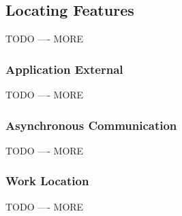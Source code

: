 \subsection{Locating Features} %
TODO ---- MORE
\subsubsection{Application External} %
TODO ---- MORE
\subsubsection{Asynchronous Communication} %
TODO ---- MORE
\subsubsection{Work Location} %
TODO ---- MORE



